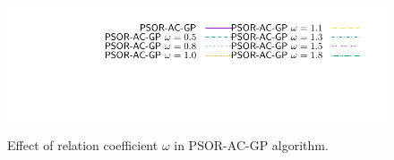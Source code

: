 \begin{figure}
\\
{\includegraphics[height=\legendheight]{../figure/PSOR/1.0e-08/50/time/profile-Chain_legend.pdf}} 
  \caption{Effect of relation coefficient $\omega$ in {\sf PSOR-AC-GP} algorithm.}
  \label{fig:PSOR}
\end{figure}

